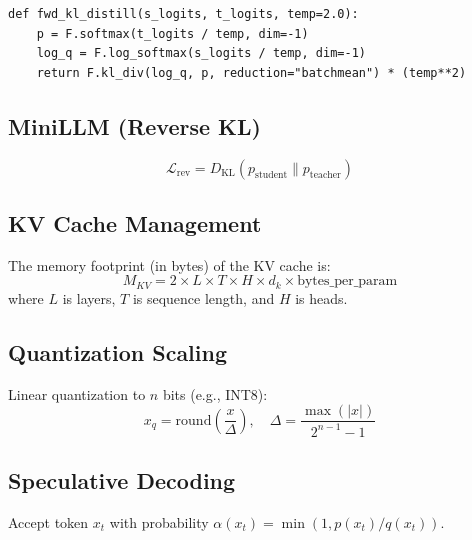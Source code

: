 \begin{lstlisting}[style=pythonstyle, caption={Forward KL distillation}, label=lst:fwd_kd]
def fwd_kl_distill(s_logits, t_logits, temp=2.0):
    p = F.softmax(t_logits / temp, dim=-1)
    log_q = F.log_softmax(s_logits / temp, dim=-1)
    return F.kl_div(log_q, p, reduction="batchmean") * (temp**2)
\end{lstlisting}

\subsection{MiniLLM (Reverse KL)}
\label{form:rev_kd}

\[
  \mathcal{L}_\mathrm{rev} = D_\mathrm{KL}(p_\mathrm{student} \| p_\mathrm{teacher})
\]

\subsection{KV Cache Management}
\label{form:kvcache}

The memory footprint (in bytes) of the KV cache is:
\[
  M_{KV} = 2 \times L \times T \times H \times d_k \times \text{bytes\_per\_param}
\]
where $L$ is layers, $T$ is sequence length, and $H$ is heads.

\subsection{Quantization Scaling}
\label{form:quant}

Linear quantization to $n$ bits (e.g., INT8):
\[
  x_q = \text{round}\!\left( \frac{x}{\Delta} \right), \quad \Delta = \frac{\max(|x|)}{2^{n-1}-1}
\]

\subsection{Speculative Decoding}
\label{form:spec_dec}

Accept token $x_t$ with probability $\alpha(x_t) = \min(1, p(x_t)/q(x_t))$.

